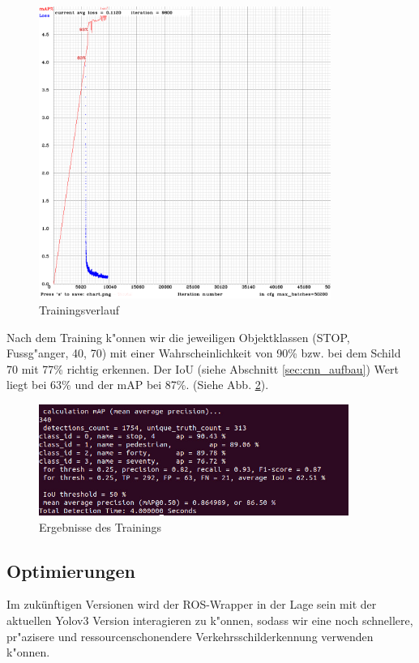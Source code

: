 \begin{figure}[h]
	\centering
	\includegraphics[width=0.85\textwidth]{images/training}
	\caption{Trainingsverlauf}
	\label{fig:training}
\end{figure}

Nach dem Training k"onnen wir die jeweiligen Objektklassen (STOP, Fussg"anger, 40, 70) mit einer Wahrscheinlichkeit von 90\% bzw. bei dem Schild 70 mit 77\% richtig erkennen. Der IoU (siehe Abschnitt \ref{sec:cnn_aufbau}) Wert liegt bei 63\% und der mAP bei 87\%. (Siehe Abb. \ref{fig:ergebnis}).

\begin{figure}[ht]
	\centering
	\includegraphics[width=0.9\textwidth]{images/ergebnis}
	\caption{Ergebnisse des Trainings}
	\label{fig:ergebnis}
\end{figure}

\subsection{Optimierungen}
Im zuk\"unftigen Versionen wird der ROS-Wrapper in der Lage sein mit der aktuellen Yolov3 Version interagieren zu k"onnen, sodass wir eine noch schnellere, pr"azisere und ressourcenschonendere Verkehrsschilderkennung verwenden k"onnen.

